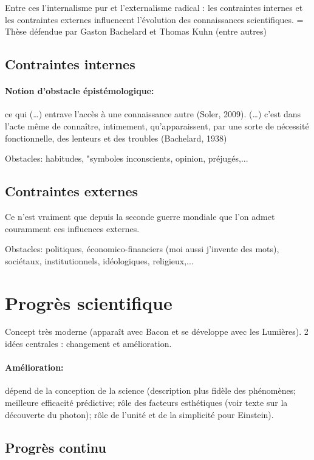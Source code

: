 \documentclass{report}
\begin{document}
	Entre ces l’internalisme pur et l’externalisme radical : les contraintes internes et les contraintes externes influencent l’évolution des connaissances scientifiques. = Thèse défendue par Gaston Bachelard et Thomas Kuhn (entre autres)
	
	\subsection{Contraintes internes}
	
	\paragraph{Notion d’obstacle épistémologique:}\og ce qui (…) entrave l’accès à une connaissance autre \fg (Soler, 2009). \og (…) c'est dans l'acte même de connaître, intimement, qu'apparaissent, par une sorte de nécessité fonctionnelle, des lenteurs et des troubles \fg (Bachelard, 1938)
	
	Obstacles: habitudes, "symboles inconscients, opinion, préjugés,...
	
	\subsection{Contraintes externes}
	
	Ce n’est vraiment que depuis la seconde guerre mondiale que l’on admet couramment ces influences externes.
	
	Obstacles: politiques, économico-financiers (moi aussi j'invente des mots), sociétaux, institutionnels, idéologiques, religieux,...
	
	\section{Progrès scientifique}
	
	Concept très moderne (apparaît avec Bacon et se développe avec les Lumières). 2 idées centrales : changement et amélioration.
	
	\paragraph{Amélioration:} dépend de la conception de la science (description plus fidèle des phénomènes; meilleure efficacité prédictive; rôle des facteurs esthétiques (voir texte sur la découverte du photon); rôle de l’unité et de la simplicité pour Einstein).
	
	\subsection{Progrès continu}
	
\end{document}
